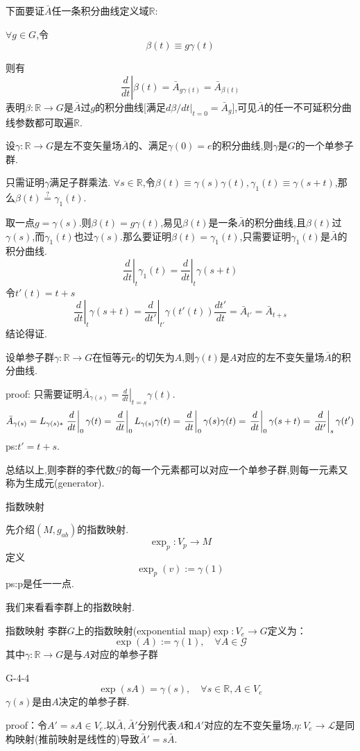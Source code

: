 \documentclass[../main.tex]{subfiles}
\begin{document}
 下面要证$\bar{A}$任一条积分曲线定义域$\mathbb{R}$:

 $\forall g \in G$,令
     $$ \beta(t) \equiv g\gamma(t) $$

 则有
     $$ \left.\frac{d}{dt}\right|\beta(t) = \bar{A}_{g\gamma(t)} = \bar{A}_{\beta(t)} $$
 表明$\beta :\mathbb{R} \rightarrow G$是$\bar{A}$过$g$的积分曲线[满足$d\beta/dt|_{t=0} = \bar{A}_g$],可见$\bar{A}$的任一不可延积分曲线参数都可取遍$\mathbb{R}$.
 \begin{theorem}
     设$\gamma:\mathbb{R} \rightarrow G$是左不变矢量场$\bar{A}$的、满足$\gamma(0) = e$的积分曲线,则$\gamma$是$G$的一个单参子群.
 \end{theorem}
 只需证明$\gamma$满足子群乘法.
 $\forall s \in \mathbb{R}$,令$\beta(t) \equiv \gamma(s)\gamma(t), \gamma_1(t) \equiv \gamma(s+t)$,那么$ \beta(t)\stackrel{?}{=}\gamma_1(t)$.

 取一点$g = \gamma(s)$.则$\beta(t) = g\gamma(t)$,易见$\beta(t)$是一条$\bar{A}$的积分曲线,且$\beta(t)$过$\gamma(s)$,而$\gamma_1(t)$也过$\gamma(s)$.那么要证明$\beta(t) = \gamma_1(t)$,只需要证明$\gamma_1(t)$是$\bar{A}$的积分曲线.
     $$ \left.\frac{d}{dt}\right|_t\gamma_1(t) = \left.\frac{d}{dt}\right|_t\gamma(s + t) $$
 令$t'(t) = t + s$
     $$ \left.\frac{d}{dt}\right|_t\gamma(s + t) = \left.\frac{d}{dt'}\right|_{t'}\gamma(t'(t))\frac{dt'}{dt} = \bar{A}_{t'} = \bar{A}_{t + s} $$
 结论得证.
 \begin{theorem}
     设单参子群$\gamma : \mathbb{R} \rightarrow G$在恒等元$e$的切矢为$A$,则$\gamma(t)$是$A$对应的左不变矢量场$\bar{A}$的积分曲线.
 \end{theorem}
 proof: 只需要证明$\bar{A}_{\gamma(s)} = \left.\frac{d}{dt}\right|_{t=s}\gamma(t)$.
 $$ \bar{A}_{\gamma(s)} = L_{\gamma(s)*}\left.\frac{d}{dt}\right|_0\gamma(t) =\left.\frac{d}{dt}\right|_0L_{\gamma(s)}\gamma(t)\\ =\left.\frac{d}{dt}\right|_0\gamma(s)\gamma(t)=\left.\frac{d}{dt}\right|_0\gamma(s+t) \\= \left.\frac{d}{dt'}\right|_s\gamma(t') $$
 ps:$t'=t+s$.

 总结以上,则李群的李代数$\mathscr{G}$的每一个元素都可以对应一个单参子群,则每一元素又称为生成元(generator).

 \vspace{1cm}
 {\LARGE 指数映射}

 先介绍$(M,g_{ab})$的指数映射.
     $$ \exp_p : V_p \rightarrow M $$
 定义
     $$ \exp_p(v):=\gamma(1) $$
 ps:p是任一一点.

 我们来看看李群上的指数映射.
 \begin{definition}{}{指数映射}
     李群$G$上的指数映射(exponential map)$\exp:V_e\rightarrow G$定义为：
         $$ \exp(A):=\gamma(1),\quad \forall A \in \mathscr{G} $$
     其中$\gamma : \mathbb{R} \rightarrow G$是与$A$对应的单参子群
 \end{definition}
\begin{theorem}{}{G-4-4}
	$$ \exp(sA) = \gamma(s),\quad \forall s\in \mathbb{R},A\in V_e $$
	$\gamma(s)$是由$A$决定的单参子群.
\end{theorem}
 proof：令$A' =sA \in V_e$.以$\bar{A},\bar{A}'$分别代表$A$和$A'$对应的左不变矢量场,$\eta : V_e\rightarrow \mathscr{L}$是同构映射(推前映射是线性的)导致$\bar{A}' =s\bar{A}$.
\end{document}
